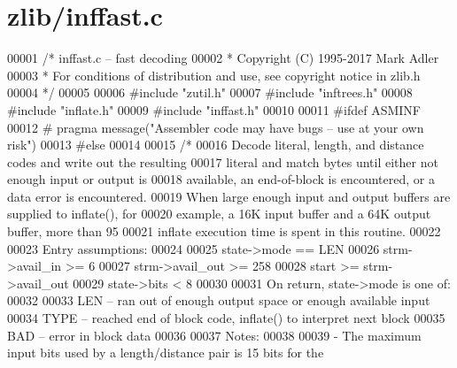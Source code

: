 \hypertarget{zlib_2inffast_8c_source}{}\section{zlib/inffast.c}
\label{zlib_2inffast_8c_source}

\begin{DoxyCode}
00001 \textcolor{comment}{/* inffast.c -- fast decoding}
00002 \textcolor{comment}{ * Copyright (C) 1995-2017 Mark Adler}
00003 \textcolor{comment}{ * For conditions of distribution and use, see copyright notice in zlib.h}
00004 \textcolor{comment}{ */}
00005 
00006 \textcolor{preprocessor}{#include "zutil.h"}
00007 \textcolor{preprocessor}{#include "inftrees.h"}
00008 \textcolor{preprocessor}{#include "inflate.h"}
00009 \textcolor{preprocessor}{#include "inffast.h"}
00010 
00011 \textcolor{preprocessor}{#ifdef ASMINF}
00012 \textcolor{preprocessor}{#  pragma message("Assembler code may have bugs -- use at your own risk")}
00013 \textcolor{preprocessor}{#else}
00014 
00015 \textcolor{comment}{/*}
00016 \textcolor{comment}{   Decode literal, length, and distance codes and write out the resulting}
00017 \textcolor{comment}{   literal and match bytes until either not enough input or output is}
00018 \textcolor{comment}{   available, an end-of-block is encountered, or a data error is encountered.}
00019 \textcolor{comment}{   When large enough input and output buffers are supplied to inflate(), for}
00020 \textcolor{comment}{   example, a 16K input buffer and a 64K output buffer, more than 95%
00021 \textcolor{comment}{   inflate execution time is spent in this routine.}
00022 \textcolor{comment}{}
00023 \textcolor{comment}{   Entry assumptions:}
00024 \textcolor{comment}{}
00025 \textcolor{comment}{        state->mode == LEN}
00026 \textcolor{comment}{        strm->avail\_in >= 6}
00027 \textcolor{comment}{        strm->avail\_out >= 258}
00028 \textcolor{comment}{        start >= strm->avail\_out}
00029 \textcolor{comment}{        state->bits < 8}
00030 \textcolor{comment}{}
00031 \textcolor{comment}{   On return, state->mode is one of:}
00032 \textcolor{comment}{}
00033 \textcolor{comment}{        LEN -- ran out of enough output space or enough available input}
00034 \textcolor{comment}{        TYPE -- reached end of block code, inflate() to interpret next block}
00035 \textcolor{comment}{        BAD -- error in block data}
00036 \textcolor{comment}{}
00037 \textcolor{comment}{   Notes:}
00038 \textcolor{comment}{}
00039 \textcolor{comment}{    - The maximum input bits used by a length/distance pair is 15 bits for the}
}
\end{DoxyCode}
